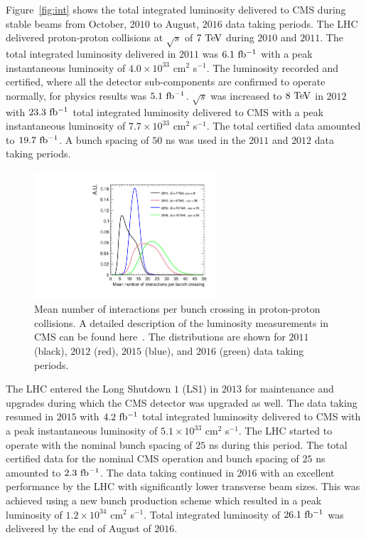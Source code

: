Figure~\ref{fig:int} shows the total integrated luminosity delivered to CMS during stable beams from October, $2010$ to August, $2016$ data taking periods. The LHC delivered proton-proton collisions at $\sqrt{s}$ of $7~\mathrm{Te\kern -0.1em V}$ during $2010$ and $2011$. The total integrated luminosity delivered in $2011$ was $6.1~\mathrm{fb^{-1}}$ with a peak instantaneous luminosity of $4.0 \times 10^{33}$ cm$^2$ s$^{-1}$. The luminosity recorded and certified, where all the detector sub-components are confirmed to operate normally, for physics results was $5.1~\mathrm{fb^{-1}}$. $\sqrt{s}$ was increased to $8~\mathrm{Te\kern -0.1em V}$ in $2012$ with $23.3~\mathrm{fb^{-1}}$ total integrated luminosity delivered to CMS with a peak instantaneous luminosity of $7.7 \times 10^{33}$ cm$^2$ s$^{-1}$. The total certified data amounted to $19.7~\mathrm{fb^{-1}}$. A bunch spacing of $50$ ns was used in the $2011$ and $2012$ data taking periods. 

 \begin{figure}[h]
\centering
\includegraphics[width=0.6\textwidth]{figures_chapter2/pileup_cms}
\caption{Mean number of interactions per bunch crossing in proton-proton collisions. A detailed description of the  luminosity measurements in CMS can be found here~\cite{CMS-PAS-LUM-13-001,CMS-PAS-LUM-15-001}. The distributions are shown for $2011$ (black), $2012$ (red), $2015$ (blue), and $2016$ (green) data taking periods.}
\label{fig:pu}
\end{figure} 

The LHC entered the Long Shutdown $1$ (LS1) in $2013$ for maintenance and upgrades during which the CMS detector was upgraded as well. The data taking resumed in $2015$ with $4.2~\mathrm{fb^{-1}}$ total integrated luminosity delivered to CMS with a peak instantaneous luminosity of $5.1 \times 10^{33}$ cm$^2$ s$^{-1}$. The LHC started to operate with the nominal bunch spacing of $25$ ns during this period. The total certified data for the nominal CMS operation and bunch spacing of $25$ ns amounted to $2.3~\mathrm{fb^{-1}}$. The data taking continued in $2016$ with an excellent performance by the LHC with significantly lower transverse beam sizes. This was achieved using a new bunch production scheme which resulted in a peak luminosity of  $1.2 \times 10^{34}$ cm$^2$ s$^{-1}$. Total integrated luminosity of $26.1~\mathrm{fb^{-1}}$ was delivered by the end of August of $2016$.   

